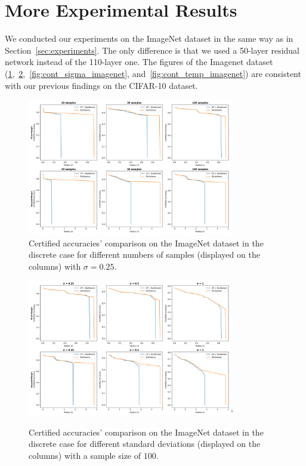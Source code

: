 \section{More Experimental Results}\label{sec:more-experimental-results}
We conducted our experiments on the ImageNet dataset in the same way as in Section~\ref{sec:experiments}.
The only difference is that we used a 50-layer residual network instead of the 110-layer one.
The figures of the Imagenet dataset (\ref{fig:discrete_num_imagenet},~\ref{fig:discrete_sigma_imagenet},~\ref{fig:cont_sigma_imagenet}, and~\ref{fig:cont_temp_imagenet}) are consistent with our previous findings on the CIFAR-10 dataset.
\begin{figure}[htbp]
    \centering
    \includegraphics[width=0.8\textwidth]{images/discrete_num_imagenet}
    \caption{Certified accuracies' comparison on the ImageNet dataset in the discrete case for different numbers of samples (displayed on the columns) with $\sigma = 0.25$.}
    \label{fig:discrete_num_imagenet}
\end{figure}
\begin{figure}[htbp]
    \centering
    \includegraphics[width=0.8\textwidth]{images/discrete_sigma_imagenet}`
    \caption{Certified accuracies' comparison on the ImageNet dataset in the discrete case for different standard deviations (displayed on the columns) with a sample size of $100$.}
    \label{fig:discrete_sigma_imagenet}
\end{figure}
